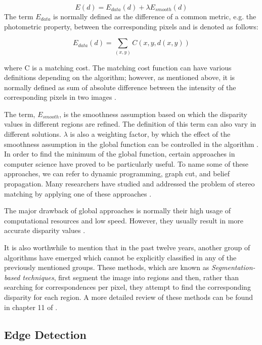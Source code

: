 \documentclass[12pt]{report}
\begin{document}
\begin{equation}
E(d)=E_{data}(d)+\lambda E_{smooth}(d)
\end{equation}
The term $E_{data}$ is normally defined as the difference of a common metric, e.g. the photometric property, between the corresponding pixels and is denoted as follows:

\begin{equation}
E_{data}(d) = \sum_{(x,y)}C(x,y,d(x,y))
\end{equation}

where C is a matching cost. The matching cost function can have various definitions depending on the algorithm; however, as mentioned above, it is normally defined as sum of absolute difference 
between the intensity of the corresponding pixels in two images \cite{sch02}.

The term, $E_{smooth}$, is the smoothness assumption based on which the disparity values in different regions are refined. The definition of this term can also vary in 
different solutions. $\lambda$ is also a weighting factor, by which the effect of the smoothness assumption in the global function can be controlled in the algorithm \cite{sze11}.
In order to find the minimum of the global function, certain approaches in computer science have proved to be particularly useful. 
To name some of these approaches, we can refer to dynamic programming, graph cut, and belief propagation. Many researchers have studied and addressed the problem of stereo matching
by applying one of these approaches \cite{sch02,boy01,boy04,kim05,sun11}.

The major drawback of global approaches is normally their high usage of computational resources and low speed. However, 
they usually result in more accurate disparity values \cite{hirsch02,sze11}. 

It is also worthwhile to mention that in the past twelve years, another group of algorithms have emerged which cannot be explicitly classified in any of the previously mentioned groups.
These methods, which are known as {\it Segmentation-based techniques}, first segment the image into regions and then, rather than searching for correspondences per pixel,
they attempt to find the corresponding disparity for each region. A more detailed review of these methods can be found in chapter 11 of \cite{sze11}.

\subsection{Edge Detection}
\end{document}
